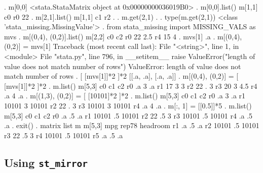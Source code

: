\documentclass{article}
\begin{document}
\begin{stlog}
{\bftt{>>>}}. m[0,0]
<stata.StataMatrix object at 0x00000000036019B0>
{\smallskip}
{\bftt{>>>}}. m[0,0].list()
{\smallskip}
m[1,1]
           c0
r0         22
{\smallskip}
{\bftt{>>>}}. m[2,1].list()
{\smallskip}
m[1,1]
           c1
r2          .
{\smallskip}
{\bftt{>>>}}. m.get(2,1)
.
{\smallskip}
{\bftt{>>>}}. type(m.get(2,1))
<class 'stata_missing.MissingValue'>
{\smallskip}
{\bftt{>>>}}. from stata_missing import MISSING_VALS as mvs
{\smallskip}
{\bftt{>>>}}. m[(0,4), (0,2)].list()
{\smallskip}
m[2,2]
           c0         c2
r0         22        2.5
r4         15          4
{\smallskip}
{\bftt{>>>}}. mvs[1]
.a
{\smallskip}
{\bftt{>>>}}. m[(0,4), (0,2)] = mvs[1]
{\color{red}Traceback (most recent call last):
  File "<string>", line 1, in <module>
  File "stata.py", line 796, in __setitem__
    raise ValueError("length of value does not match number of rows")
ValueError: length of value does not match number of rows}
{\smallskip}
{\bftt{>>>}}. [ [mvs[1]]*2 ]*2
[[.a, .a], [.a, .a]]
{\smallskip}
{\bftt{>>>}}. m[(0,4), (0,2)] = [ [mvs[1]]*2 ]*2
{\smallskip}
{\bftt{>>>}}. m.list()
{\smallskip}
m[5,3]
           c0         c1         c2
r0         .a          3         .a
r1         17          3          3
r2         22          .          3
r3         20          3        4.5
r4         .a          4         .a
{\smallskip}
{\bftt{>>>}}. m[(1,3), (0,2)] = [ [10101]*2 ]*2
{\smallskip}
{\bftt{>>>}}. m.list()
{\smallskip}
m[5,3]
           c0         c1         c2
r0         .a          3         .a
r1      10101          3      10101
r2         22          .          3
r3      10101          3      10101
r4         .a          4         .a
{\smallskip}
{\bftt{>>>}}. m[:, 1] = [[0.5]]*5
{\smallskip}
{\bftt{>>>}}. m.list()
{\smallskip}
m[5,3]
           c0         c1         c2
r0         .a         .5         .a
r1      10101         .5      10101
r2         22         .5          3
r3      10101         .5      10101
r4         .a         .5         .a
{\smallskip}
{\bftt{>>>}}. exit()
{\smallskip}
. matrix list m
{\smallskip}
m[5,3]
         mpg     rep78  headroom
r1        .a        .5        .a
r2     10101        .5     10101
r3        22        .5         3
r4     10101        .5     10101
r5        .a        .5        .a
{\smallskip}
\end{stlog}

\smallskip



\subsection{Using \lstinline$st_mirror$} \label{st_mirror_example}
\end{document}
